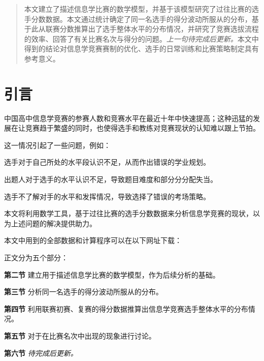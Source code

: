 \begin{abstract}
    本文建立了描述信息学比赛的数学模型，并基于该模型研究了过往比赛的选手分数数据。本文通过统计确定了同一名选手的得分波动所服从的分布，基于此从联赛分数推算出了选手整体水平的分布情况，并研究了竞赛选拔流程的效率、回答了有关比赛名次与得分的问题。\emph{上一句待完成后更新。}本文中得到的结论对信息学竞赛赛制的优化、选手的日常训练和比赛策略制定具有参考意义。
\end{abstract}

\section{引言}

    中国高中信息学竞赛的参赛人数和竞赛水平在最近十年中快速提高；这种迅猛的发展在让竞赛趋于繁盛的同时，也使得选手和教练对竞赛现状的认知难以跟上节拍。
    
    这一情况引起了一些问题，例如：

    \begin{asparaitem}
        \item {选手对于自己所处的水平段认识不足，从而作出错误的学业规划。}
        \item {出题人对于选手的水平认识不足，导致题目难度和部分分分配失当。}
        \item {选手不了解对手的水平和发挥情况，导致选择了错误的考场策略。}
    \end{asparaitem}

    本文将利用数学工具，基于过往比赛的选手分数数据来分析信息学竞赛的现状，以为上述问题的解决提供助力。

    \vspace{1.5ex}

    \begin{samepage}
        本文中用到的全部数据和计算程序可以在以下网址下载：\nobreak
        \begin{compactitem}
            \item {}
            \item {}
        \end{compactitem}
    \end{samepage}

    \vspace{1.5ex}

    正文分为五个部分：

    \begin{asparaenum}
        \item [\textbf{第二节}]{建立用于描述信息学比赛的数学模型，作为后续分析的基础。}
        \item [\textbf{第三节}]{分析同一名选手的得分波动所服从的分布。}
        \item [\textbf{第四节}]{利用联赛初赛、复赛的得分数据推算出信息学竞赛选手整体水平的分布情况。}
        \item [\textbf{第五节}]{对于在比赛名次中出现的现象进行讨论。}
        \item [\textbf{第六节}]{\emph{待完成后更新。}}
    \end{asparaenum}

